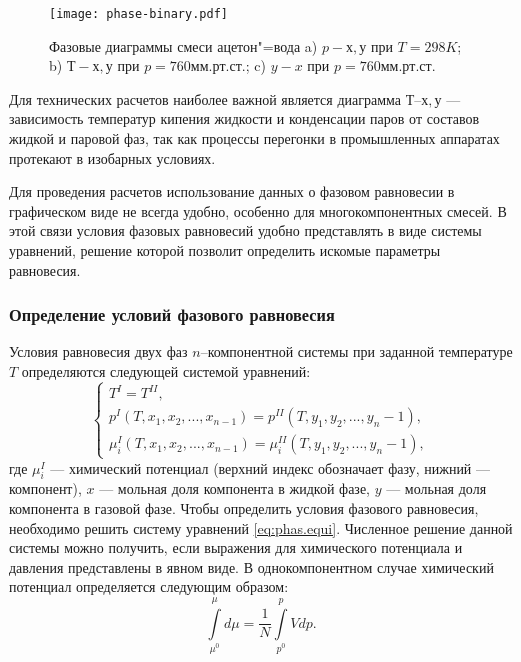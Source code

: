 \begin{figure}
	\begin{center}
		\texttt{[image: phase-binary.pdf]}
	\end{center}
	\caption{Фазовые диаграммы смеси ацетон"=вода a) $p - х, у$ при $T = 298 K$; b) $Т - х, у$ при $p = 760 мм.рт.ст.$; c) $y - x$ при $p = 760 мм.рт.ст.$} \label{fig:phase-id.f4}
\end{figure}

Для технических расчетов наиболее важной является диаграмма $Т – х, у$ --- зависимость температур кипения жидкости и конденсации паров от составов жидкой и паровой фаз, так как процессы перегонки в промышленных аппаратах протекают в изобарных условиях. 

Для проведения расчетов использование данных о фазовом равновесии в графическом виде не всегда удобно, особенно для многокомпонентных смесей. В этой связи условия фазовых равновесий удобно представлять в виде системы уравнений, решение которой позволит определить искомые параметры равновесия. 


\subsubsection{Определение условий фазового равновесия}
Условия равновесия двух фаз $n$--компонентной системы при заданной температуре $T$ определяются следующей системой уравнений:
\begin{equation}\label{eq:phas.equi}
\left\lbrace 
\begin{gathered} 
T^{I}=T^{II},\\
p^{I}(T,x_1,x_2,...,x_{n-1})=p^{II}(T,y_1,y_2,...,y_n-1),\\
\mu_i^{I}(T,x_1,x_2,...,x_{n-1})=\mu^{II}_i(T,y_1,y_2,...,y_n-1),
\end{gathered} 
\right.
\end{equation}
где $\mu^I_i$ --- химический потенциал (верхний индекс обозначает фазу, нижний --- компонент), $x$ --- мольная доля компонента в жидкой фазе, $y$ --- мольная доля компонента в газовой фазе. Чтобы определить условия фазового равновесия, необходимо решить систему уравнений \eqref{eq:phas.equi}. Численное решение данной системы можно получить, если выражения для химического потенциала и давления представлены в явном виде.
В однокомпонентном случае химический потенциал определяется следующим образом:
\begin{equation}
\int\limits_{\mu^0}^{\mu} d \mu=\dfrac{1}{N} \int\limits_{p^0}^{p} Vdp.
\end{equation}

